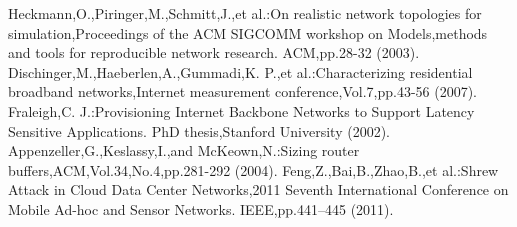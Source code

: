\documentclass[Japanese]{dicomopapers}
\begin{document}
\begin{thebibliography}{99}
     Heckmann,O.,Piringer,M.,Schmitt,J.,et al.:On realistic network topologies for simulation,Proceedings of the ACM SIGCOMM workshop on Models,methods and tools for reproducible network research. ACM,pp.28-32 (2003).
     Dischinger,M.,Haeberlen,A.,Gummadi,K. P.,et al.:Characterizing residential broadband networks,Internet measurement conference,Vol.7,pp.43-56 (2007).
     Fraleigh,C. J.:Provisioning Internet Backbone Networks to Support Latency Sensitive Applications. PhD thesis,Stanford University (2002).
     Appenzeller,G.,Keslassy,I.,and McKeown,N.:Sizing router buffers,ACM,Vol.34,No.4,pp.281-292 (2004).
     Feng,Z.,Bai,B.,Zhao,B.,et al.:Shrew Attack in Cloud Data Center Networks,2011 Seventh International Conference on Mobile Ad-hoc and Sensor Networks. IEEE,pp.441–445 (2011).
\end{thebibliography}
\end{document}
